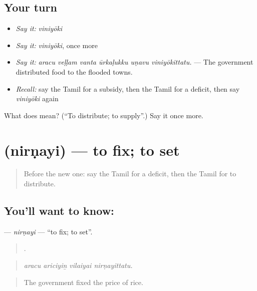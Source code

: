 \subsection*{Your turn}
\begin{itemize}
\raggedright
  \item \emph{Say it:} \emph{viniyōki}
  \item \emph{Say it:} \emph{viniyōki}, once more
  \item \emph{Say it:} \emph{aracu veḷḷam vanta ūrkaḷukku uṇavu viniyōkittatu.} — The government distributed food to the flooded towns.
  \item \emph{Recall:} say the Tamil for a subsidy, then the Tamil for a deficit, then say \emph{viniyōki} again
\end{itemize}

\begin{tcolorbox}[breakable,colback=teal!4,colframe=teal!35!black,title={Before you move on}]
What does  mean? (\textquotedblleft{}To distribute; to supply\textquotedblright{}.) Say it once more.
\end{tcolorbox}
\section[\texorpdfstring{\ta{நிர்ணயி} (nirṇayi)}{நிர்ணயி (nirṇayi)}]{ (nirṇayi) — to fix; to set}

\label{lesson:TA-C391-nirnayi}



\begin{quote}
Before the new one: say the Tamil for a deficit, then the Tamil for to distribute.
\end{quote}

\subsection*{You'll want to know: }
\textbf{} — \emph{nirṇayi} — \textquotedblleft{}to fix; to set\textquotedblright{}.

\begin{quote}
   .
\end{quote}

\begin{quote}
\emph{aracu ariciyiṉ vilaiyai nirṇayittatu.}
\end{quote}

\begin{quote}
The government fixed the price of rice.
\end{quote}

